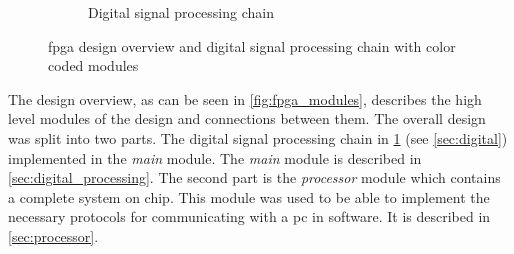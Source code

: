 \documentclass[12pt,a4paper,parskip=full,abstract=true,BCOR=12mm,twoside,open=right]{scrreprt}
\def\device#1{\mbox{\textit{#1}}}
\begin{document}
\begin{figure}[htb]
\begin{subfigure}[c]{.29\linewidth}
{
        }
        \caption{Digital signal processing chain}
        \label{fig:digital_chain}
    \end{subfigure}
    \caption{\gls{fpga} design overview and digital signal processing chain with color coded modules}
    \label{fig:fpga_overview}
\end{figure}

The design overview, as can be seen in \cref{fig:fpga_modules}, describes
the high level modules of the design and connections between them. The overall
design was split into two parts. The digital signal processing chain
in \cref{fig:digital_chain} (see \cref{sec:digital}) implemented in the
\device{main} module. The \device{main} module is described in
\cref{sec:digital_processing}. The second part is the \device{processor} module
which contains a complete system on chip. This module was used to be able to
implement the necessary protocols for communicating with a \gls{pc} in software.
It is described in \cref{sec:processor}.
\end{document}
